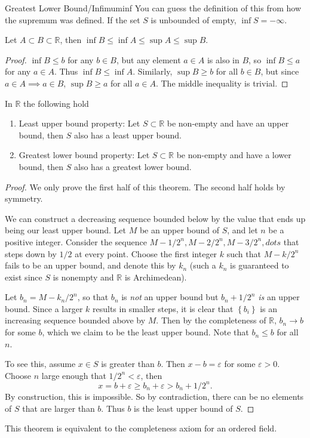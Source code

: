 \documentclass[10pt]{report}
\begin{document}
\begin{defn}{Greatest Lower Bound/Infimum}{inf}
	You can guess the definition of this from how the supremum was defined. If the set $S$ is unbounded of empty, $\inf S = -\infty$.
\end{defn}

\begin{prop}
	Let $A \subset B \subset \mathbb{R}$, then $\inf B \leq \inf A \leq \sup A \leq \sup B$.
\end{prop}
\begin{proof}
	$\inf B \leq b$ for any $b \in B$, but any element $a \in A$ is also in $B$, so $\inf B \leq a$ for any $a \in A$. Thus $\inf B \leq \inf A$. Similarly, $\sup B \geq b$ for all $b \in B$, but since $a \in A \implies a \in B$, $\sup B \geq a$ for all $a \in A$. The middle inequality is trivial.
\end{proof}

\begin{thrm}{}{}
	In $\mathbb{R}$ the following hold
	\begin{enumerate}
		\item Least upper bound property: Let $S \subset \mathbb{R}$ be non-empty and have an upper bound, then $S$ also has a least upper bound.
		\item Greatest lower bound property: Let $S \subset \mathbb{R}$ be non-empty and have a lower bound, then $S$ also has a greatest lower bound.
	\end{enumerate}
\end{thrm}
\begin{proof}
	We only prove the first half of this theorem. The second half holds by symmetry.

	We can construct a decreasing sequence bounded below by the value that ends up being our least upper bound. Let $M$ be an upper bound of $S$, and let $n$ be a positive integer. Consider the sequence $M-1/2^n, M-2/2^n, M-3/2^n, dots$ that steps down by $1/2$ at every point. Choose the first integer $k$ such that $M - k/2^n$ fails to be an upper bound, and denote this by $k_n$ (such a $k_n$ is guaranteed to exist since $S$ is nonempty and $\mathbb{R}$ is Archimedean).

	Let $b_n = M - k_n/2^n$, so that $b_n$ is \textit{not} an upper bound but $b_n + 1/2^n$ \textit{is} an upper bound. Since a larger $k$ results in smaller steps, it is clear that $\left\{ b_i \right\}$ is an increasing sequence bounded above by $M$. Then by the completeness of $\mathbb{R}$, $b_n \to b$ for some $b$, which we claim to be the least upper bound. Note that $b_n \leq b$ for all $n$.

	To see this, assume $x \in S$ is greater than $b$. Then $x - b = \varepsilon$ for some $\varepsilon>0$. Choose $n$ large enough that $1/2^n < \varepsilon$, then
	\[
	x = b + \varepsilon \geq b_n +\varepsilon > b_n + 1/2^n.
	\] 
	By construction, this is impossible. So by contradiction, there can be no elements of $S$ that are larger than $b$. Thus $b$ is the least upper bound of $S$.
\end{proof}
This theorem is equivalent to the completeness axiom for an ordered field.
\end{document}
